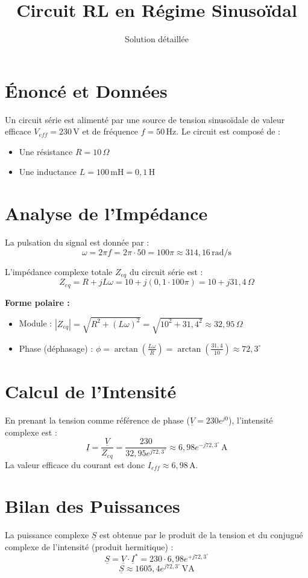 \documentclass[12pt]{article}
\title{Circuit RL en Régime Sinusoïdal}
\author{Solution détaillée}
\date{}
\begin{document}
\maketitle

\section{Énoncé et Données}
Un circuit série est alimenté par une source de tension sinusoïdale de valeur efficace $V_{eff} = 230 \, \text{V}$ et de fréquence $f = 50 \, \text{Hz}$. Le circuit est composé de :
\begin{itemize}
    \item Une résistance $R = 10 \, \Omega$
    \item Une inductance $L = 100 \, \text{mH} = 0,1 \, \text{H}$
\end{itemize}

\section{Analyse de l'Impédance}
La pulsation du signal est donnée par :
\[ \omega = 2\pi f = 2\pi \cdot 50 = 100\pi \approx 314,16 \, \text{rad/s} \]

L'impédance complexe totale $Z_{eq}$ du circuit série est :
\[ Z_{eq} = R + jL\omega = 10 + j(0,1 \cdot 100\pi) = 10 + j31,4 \, \Omega \]

\textbf{Forme polaire :}
\begin{itemize}
    \item Module : $|Z_{eq}| = \sqrt{R^2 + (L\omega)^2} = \sqrt{10^2 + 31,4^2} \approx 32,95 \, \Omega$
    \item Phase (déphasage) : $\phi = \arctan\left(\frac{L\omega}{R}\right) = \arctan\left(\frac{31,4}{10}\right) \approx 72,3^\circ$
\end{itemize}

\section{Calcul de l'Intensité}
En prenant la tension comme référence de phase ($\underline{V} = 230e^{j0}$), l'intensité complexe est :
\[ \underline{I} = \frac{\underline{V}}{Z_{eq}} = \frac{230}{32,95e^{j72,3^\circ}} \approx 6,98 e^{-j72,3^\circ} \, \text{A} \]
La valeur efficace du courant est donc $I_{eff} \approx 6,98 \, \text{A}$.

\section{Bilan des Puissances}
La puissance complexe $\underline{S}$ est obtenue par le produit de la tension et du conjugué complexe de l'intensité (produit hermitique) :
\[ \underline{S} = \underline{V} \cdot \underline{I}^* = 230 \cdot 6,98e^{+j72,3^\circ} \]
\[ \underline{S} \approx 1605,4e^{j72,3^\circ} \, \text{VA} \]
\end{document}

